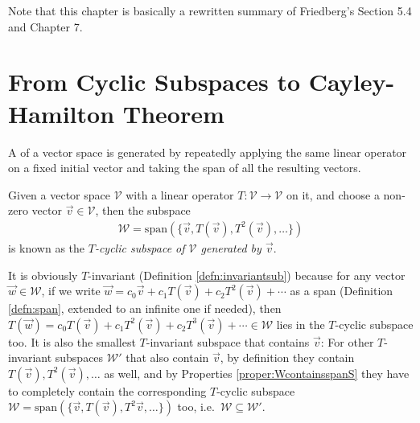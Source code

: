 Note that this chapter is basically a rewritten summary of Friedberg's Section 5.4 and Chapter 7. 

\section{From Cyclic Subspaces to Cayley-Hamilton Theorem}
\label{section:B1}

A  of a vector space is generated by repeatedly applying the same linear operator on a fixed initial vector and taking the span of all the resulting vectors.
\begin{defn}
Given a vector space $\mathcal{V}$ with a linear operator $T: \mathcal{V} \to \mathcal{V}$ on it, and choose a non-zero vector $\vec{v} \in \mathcal{V}$, then the subspace
\begin{align}
\mathcal{W} = \text{span}(\{\vec{v}, T(\vec{v}), T^2(\vec{v}), \ldots\})
\end{align}
is known as the \textit{$T$-cyclic subspace of $\mathcal{V}$ generated by $\vec{v}$}. 
\end{defn}
It is obviously $T$-invariant (Definition \ref{defn:invariantsub}) because for any vector $\vec{w} \in \mathcal{W}$, if we write $\vec{w} = c_0\vec{v} + c_1T(\vec{v}) + c_2T^2(\vec{v}) + \cdots$ as a span (Definition \ref{defn:span}, extended to an infinite one if needed), then $T(\vec{w}) = c_0T(\vec{v}) + c_1T^2(\vec{v}) + c_2T^3(\vec{v}) + \cdots \in \mathcal{W}$ lies in the $T$-cyclic subspace too. It is also the smallest $T$-invariant subspace that contains $\vec{v}$: For other $T$-invariant subspaces $\mathcal{W}'$ that also contain $\vec{v}$, by definition they contain $T(\vec{v}), T^2(\vec{v}), \ldots$ as well, and by Properties \ref{proper:WcontainsspanS} they have to completely contain the corresponding $T$-cyclic subspace $\mathcal{W} = \text{span}(\{\vec{v}, T(\vec{v}), T^2\vec{v}, \ldots\})$ too, i.e.\ $\mathcal{W} \subseteq \mathcal{W}'$.\par

